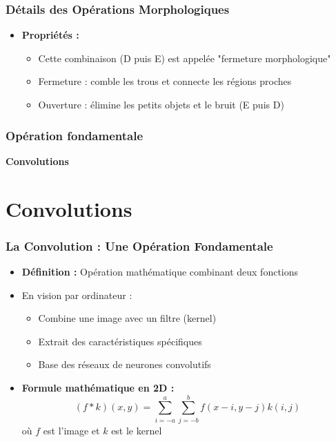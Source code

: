 \documentclass{beamer}
\begin{document}
\begin{frame}
    \frametitle{Détails des Opérations Morphologiques}
    \begin{itemize}
        \item \textbf{Propriétés :}
        \begin{itemize}
            \item Cette combinaison (D puis E) est appelée "fermeture morphologique"
            \item Fermeture : comble les trous et connecte les régions proches
            \item Ouverture : élimine les petits objets et le bruit (E puis D)
        \end{itemize}
    \end{itemize}
\end{frame}

\begin{frame}
    \frametitle{Opération fondamentale}
    \begin{center}
        \Huge{\textbf{Convolutions}}
    \end{center}
\end{frame}

\section{Convolutions}

\begin{frame}
    \frametitle{La Convolution : Une Opération Fondamentale}
    \begin{itemize}
        \item \textbf{Définition :} Opération mathématique combinant deux fonctions
        \item En vision par ordinateur : 
        \begin{itemize}
            \item Combine une image avec un filtre (kernel)
            \item Extrait des caractéristiques spécifiques
            \item Base des réseaux de neurones convolutifs
        \end{itemize}
        \item \textbf{Formule mathématique en 2D :}
        \[ (f * k)(x,y) = \sum_{i=-a}^a \sum_{j=-b}^b f(x-i,y-j)k(i,j) \]
        où \(f\) est l'image et \(k\) est le kernel
    \end{itemize}
\end{frame}
\end{document}
